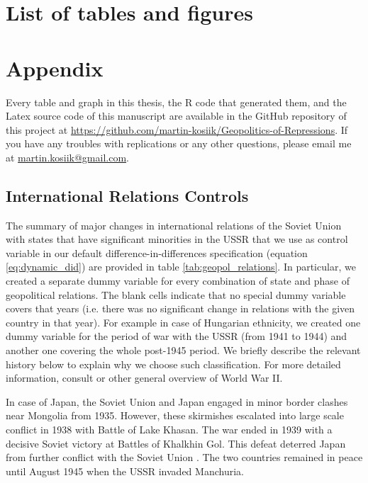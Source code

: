 \newpage
\section*{List of tables and figures}
\listoftables
\listoffigures



\newpage
\section*{Appendix}
Every table and graph in this thesis, the R code that generated them, and the Latex source code of this manuscript are available in the GitHub repository of this project at \url{https://github.com/martin-kosiik/Geopolitics-of-Repressions}.
If you have any troubles with replications or any other questions, please email me at \href{mailto:martin.kosiik@gmail.com}{martin.kosiik@gmail.com}.
\setcounter{table}{0}
\renewcommand{\thetable}{A\arabic{table}}

\setcounter{figure}{0}
\renewcommand{\thefigure}{A\arabic{figure}}

\subsection*{International Relations Controls} \label{subsec:geopol_rel_controls}
The summary of major changes in international relations of the Soviet Union with states that have significant minorities in the USSR that we use as control variable in our default  difference-in-differences specification (equation \ref{eq:dynamic_did}) are provided in table \ref{tab:geopol_relations}. In particular, we created a separate dummy variable for every combination of state and  phase of geopolitical relations. 
The blank cells indicate that no special dummy variable covers that years (i.e. there was no significant change in relations with the given country in that year).
For example in case of Hungarian ethnicity, we created one dummy variable for the period of war with the USSR (from 1941 to 1944) and another one covering the whole post-1945 period. 
We briefly describe the relevant history below to explain why we choose such classification. 
For more detailed information, consult \citet{weinberg_world_2005} or other general overview of World War II.

In case of Japan, the Soviet Union and Japan engaged in minor border clashes near Mongolia from 1935. However, these skirmishes escalated into large scale conflict in 1938 with Battle of Lake Khasan. The war ended in 1939 with a decisive Soviet victory at Battles of Khalkhin  Gol. This defeat deterred Japan from further conflict with the Soviet Union \citep{haslam_soviet_1992}. The two countries remained in peace until August 1945 when the USSR invaded Manchuria. 

